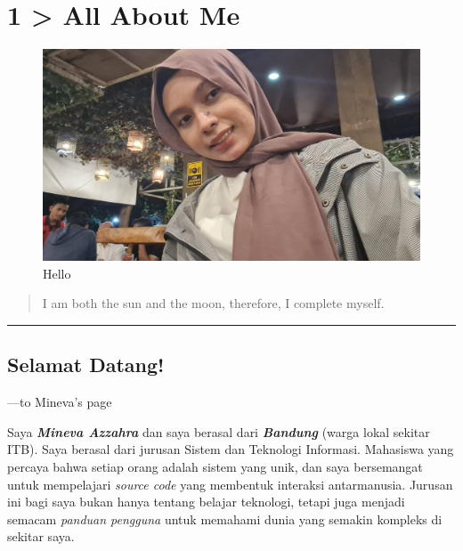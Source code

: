 \documentclass[
  letterpaper,
  DIV=11,
  numbers=noendperiod]{scrreprt}
\begin{document}

\chapter{1 \textgreater{} All About Me}\label{all-about-me}

\begin{figure}[H]

{\centering \includegraphics[width=1\linewidth,height=\textheight,keepaspectratio]{images/mi.jpeg}

}

\caption{Hello}

\end{figure}%

\begin{quote}
I am both the sun and the moon, therefore, I complete myself.
\end{quote}

\begin{center}\rule{0.5\linewidth}{0.5pt}\end{center}

\section{Selamat Datang!}\label{selamat-datang}

---to Mineva's page

Saya \textbf{\emph{Mineva Azzahra}} dan saya berasal dari
\textbf{\emph{Bandung}} (warga lokal sekitar ITB). Saya berasal dari
jurusan Sistem dan Teknologi Informasi. Mahasiswa yang percaya bahwa
setiap orang adalah sistem yang unik, dan saya bersemangat untuk
mempelajari \emph{source code} yang membentuk interaksi antarmanusia.
Jurusan ini bagi saya bukan hanya tentang belajar teknologi, tetapi juga
menjadi semacam \emph{panduan pengguna} untuk memahami dunia yang
semakin kompleks di sekitar saya.
\end{document}
